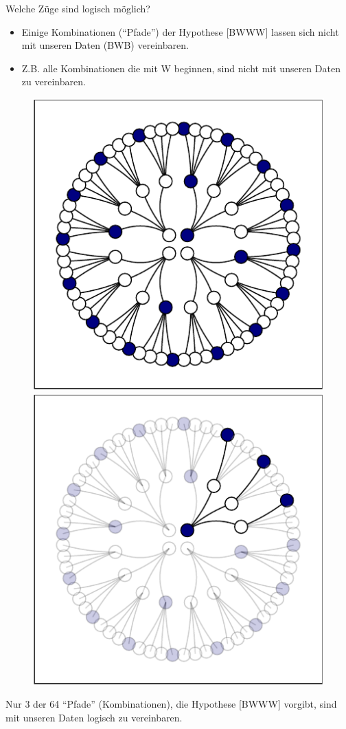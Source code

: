 \documentclass[
  ngerman,
  ignorenonframetext,
]{beamer}
\providecommand{\tightlist}{%
  \setlength{\itemsep}{0pt}\setlength{\parskip}{0pt}}
\begin{document}
\begin{frame}{Welche Züge sind logisch möglich?}
\protect\hypertarget{welche-zuxfcge-sind-logisch-muxf6glich}{}
\begin{itemize}
\tightlist
\item
  Einige Kombinationen (\enquote{Pfade}) der Hypothese {[}BWWW{]} lassen
  sich nicht mit unseren Daten (BWB) vereinbaren.
\item
  Z.B. alle Kombinationen die mit W beginnen, sind nicht mit unseren
  Daten zu vereinbaren.
\end{itemize}

\begin{figure}[H]
\includegraphics[width=0.33\linewidth]{unnamed-chunk-11-1} \includegraphics[width=0.33\linewidth]{unnamed-chunk-11-2} \end{figure}

Nur 3 der 64 \enquote{Pfade} (Kombinationen), die Hypothese {[}BWWW{]}
vorgibt, sind mit unseren Daten logisch zu vereinbaren.
\end{frame}
\end{document}
